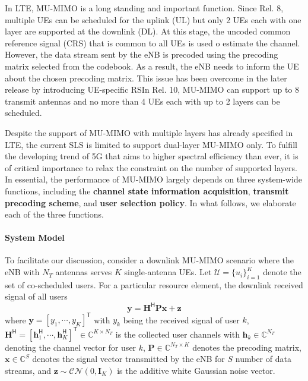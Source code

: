 \documentclass[a4paper,12pt]{article}%
\begin{document}
In LTE, MU-MIMO is a long standing and important function. Since Rel. 8, multiple UEs can be scheduled for the uplink (UL) but only 2 UEs each with one layer are supported at the downlink (DL). At this stage, the uncoded common reference signal (CRS) that is common to all UEs is used o estimate the channel. However, the data stream sent by the eNB is precoded using the precoding matrix selected from the codebook. As a result, the eNB needs to inform the UE about the chosen precoding matrix. This issue has been overcome in the later release by introducing UE-specific RSIn Rel. 10, MU-MIMO can support up to 8 transmit antennas and no more than 4 UEs each with up to 2 layers can be scheduled.
 
Despite the support of MU-MIMO with multiple layers has already specified in LTE, the current SLS is limited to support dual-layer MU-MIMO only. To fulfill the developing trend of 5G that aims to higher spectral efficiency than ever, it is of critical importance to relax the constraint on the number of supported layers. In essential, the performance of MU-MIMO largely depends on three system-wide functions, including the \textbf{channel state information acquisition}, \textbf{transmit precoding scheme}, and \textbf{user selection policy}. In what follows, we elaborate each of the three functions. %

\paragraph{System Model}

To facilitate our discussion, consider a downlink MU-MIMO scenario where the eNB with $N_T$ antennas serves $K$ single-antenna UEs. Let $\mathcal{U}=\{u_i\}_{i=1}^K$ denote the set of
co-scheduled users. For a particular resource element, the  downlink received signal of all users 
\begin{equation}\label{eq:rec-sig-mumimo}
\mathbf{y}=\mathbf{H}^\mathsf{H} \mathbf{P} \mathbf{x} + \mathbf{z}
\end{equation}
where $\mathbf{y}=[y_1,\cdots,y_K]^{\mathsf{T}}$ with $y_k$ being the received signal of user $k$, $\mathbf{H}^\mathsf{H}=[\mathbf{h}_1^\mathsf{H}, \cdots, \mathbf{h}_K^\mathsf{H}]^\mathsf{T} \in
\mathbb{C}^{K \times N_T}$ is the collected user channels with
$\mathbf{h}_k\in \mathbb{C}^{N_T}$ denoting the channel vector for user
$k$, $\mathbf{P} \in \mathbb{C}^{N_T \times K}$ denotes the precoding
matrix, $\mathbf{x} \in \mathbb{C}^{S}$ denotes the signal vector
transmitted by the eNB for $S$ number of data streams, and $\mathbf{z}\sim \mathcal{CN}(0,
\mathbf{I}_K)$ is the additive white Gaussian noise vector.
\end{document}

